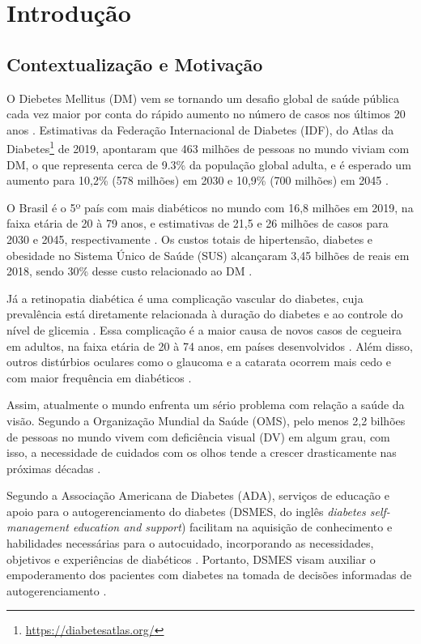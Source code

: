 \chapter{Introdução}
\label{ch:intro}

\section{Contextualização e Motivação}

O Diebetes Mellitus (DM) vem se tornando um desafio global de saúde pública cada vez maior por conta do rápido aumento no número de casos nos últimos
20 anos \cite{ADA2019}.
Estimativas da Federação Internacional de Diabetes (IDF), do Atlas da Diabetes\footnote{\url{https://diabetesatlas.org/}}
de 2019, apontaram que 463 milhões de pessoas no mundo viviam com DM, o que representa cerca de 9.3\% da população
global adulta, e é esperado um aumento para 10,2\% (578 milhões) em 2030 e 10,9\% (700 milhões) em 2045 \cite{SAEEDI2019107843}.

O Brasil é o 5º país com mais diabéticos no mundo com 16,8 milhões em 2019, na faixa etária de 20 à 79 anos, e estimativas
de 21,5 e 26 milhões de casos para 2030 e 2045, respectivamente \cite{SAEEDI2019107843}. Os custos totais de hipertensão, diabetes
e obesidade no Sistema Único de Saúde (SUS) alcançaram 3,45 bilhões de reais em 2018, sendo 30\% desse custo relacionado ao DM \cite{Nilson2020}.

Já a retinopatia diabética é uma complicação vascular do diabetes, cuja prevalência está diretamente relacionada à duração
do diabetes e ao controle do nível de glicemia \cite{Solomon412}. Essa complicação é a maior causa de novos casos de cegueira
em adultos, na faixa etária de 20 à 74 anos, em países desenvolvidos \cite{ADA2019}. Além disso, outros distúrbios oculares
como o glaucoma e a catarata ocorrem mais cedo e com maior frequência em diabéticos \cite{ADA2019}.

Assim, atualmente o mundo enfrenta um sério problema com relação a saúde da visão. Segundo a Organização Mundial da Saúde (OMS),
pelo menos 2,2 bilhões de pessoas no mundo vivem com deficiência visual (DV) em algum grau, com isso,
a necessidade de cuidados com os olhos tende a crescer drasticamente nas próximas décadas \cite{WHO2019}.

Segundo a Associação Americana de Diabetes (ADA), serviços de educação e apoio para o autogerenciamento do diabetes
(DSMES, do inglês \emph{diabetes self-management education and support}) facilitam na aquisição de conhecimento e habilidades
necessárias para o autocuidado, incorporando as necessidades, objetivos e experiências de diabéticos \cite{ADA2019}. Portanto, DSMES
visam auxiliar o empoderamento dos pacientes com diabetes na tomada de decisões informadas de autogerenciamento \cite{Marrero2013}.

